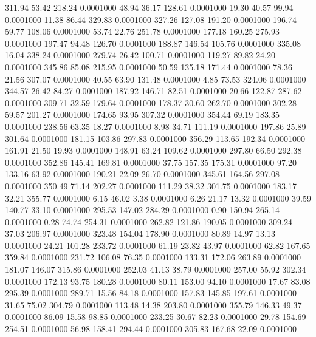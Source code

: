  311.94   53.42  218.24   0.0001000
  48.94   36.17  128.61   0.0001000
  19.30   40.57   99.94   0.0001000
  11.38   86.44  329.83   0.0001000
 327.26  127.08  191.20   0.0001000
 196.74   59.77  108.06   0.0001000
  53.74   22.76  251.78   0.0001000
 177.18  160.25  275.93   0.0001000
 197.47   94.48  126.70   0.0001000
 188.87  146.54  105.76   0.0001000
 335.08   16.04  338.24   0.0001000
 279.74   26.42  100.71   0.0001000
 119.27   89.82   24.20   0.0001000
 345.86   85.08  215.95   0.0001000
  50.59  135.18  171.44   0.0001000
  78.36   21.56  307.07   0.0001000
  40.55   63.90  131.48   0.0001000
   4.85   73.53  324.06   0.0001000
 344.57   26.42   84.27   0.0001000
 187.92  146.71   82.51   0.0001000
  20.66  122.87  287.62   0.0001000
 309.71   32.59  179.64   0.0001000
 178.37   30.60  262.70   0.0001000
 302.28   59.57  201.27   0.0001000
 174.65   93.95  307.32   0.0001000
 354.44   69.19  183.35   0.0001000
 238.56   63.35   18.27   0.0001000
   8.98   34.71  111.19   0.0001000
 197.86   25.89  301.64   0.0001000
 181.15  103.86  297.83   0.0001000
 356.29  113.65  192.34   0.0001000
 161.91   21.50   19.93   0.0001000
 148.91   63.24  109.62   0.0001000
 297.80   66.50  292.38   0.0001000
 352.86  145.41  169.81   0.0001000
  37.75  157.35  175.31   0.0001000
  97.20  133.16   63.92   0.0001000
 190.21   22.09   26.70   0.0001000
 345.61  164.56  297.08   0.0001000
 350.49   71.14  202.27   0.0001000
 111.29   38.32  301.75   0.0001000
 183.17   32.21  355.77   0.0001000
   6.15   46.02    3.38   0.0001000
   6.26   21.17   13.32   0.0001000
  39.59  140.77   33.10   0.0001000
 295.53  147.02  284.29   0.0001000
   0.90  150.94  265.14   0.0001000
   0.28   74.74  254.31   0.0001000
 262.82  121.86  190.05   0.0001000
 309.24   37.03  206.97   0.0001000
 323.48  154.04  178.90   0.0001000
  80.89   14.97   13.13   0.0001000
  24.21  101.28  233.72   0.0001000
  61.19   23.82   43.97   0.0001000
  62.82  167.65  359.84   0.0001000
 231.72  106.08   76.35   0.0001000
 133.31  172.06  263.89   0.0001000
 181.07  146.07  315.86   0.0001000
 252.03   41.13   38.79   0.0001000
 257.00   55.92  302.34   0.0001000
 172.13   93.75  180.28   0.0001000
  80.11  153.00   94.10   0.0001000
  17.67   83.08  295.39   0.0001000
 289.71   15.56   84.18   0.0001000
 157.83  145.85  197.61   0.0001000
  31.65   75.02  304.79   0.0001000
 113.48   14.38  203.80   0.0001000
 355.79  146.33   49.37   0.0001000
  86.09   15.58   98.85   0.0001000
 233.25   30.67   82.23   0.0001000
  29.78  154.69  254.51   0.0001000
  56.98  158.41  294.44   0.0001000
 305.83  167.68   22.09   0.0001000
